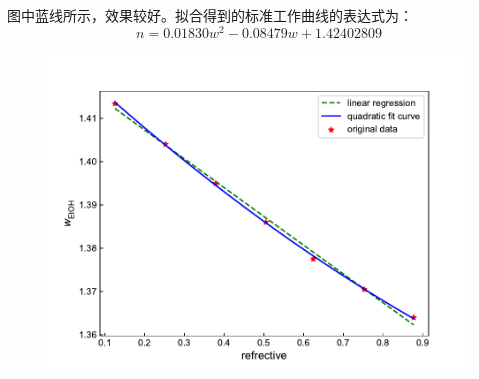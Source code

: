 \documentclass[12pt]{article}
\begin{document}
		图中蓝线所示，效果较好。拟合得到的标准工作曲线的表达式为：
		\begin{equation}
			n = 0.01830w^2 - 0.08479w + 1.42402809
			\label{working eq}
		\end{equation}
		\begin{figure}[htbp]
			\centering
			\includegraphics[scale=0.7]{working_curve.pdf}
			\label{standard w c}
		\end{figure}
\end{document}
